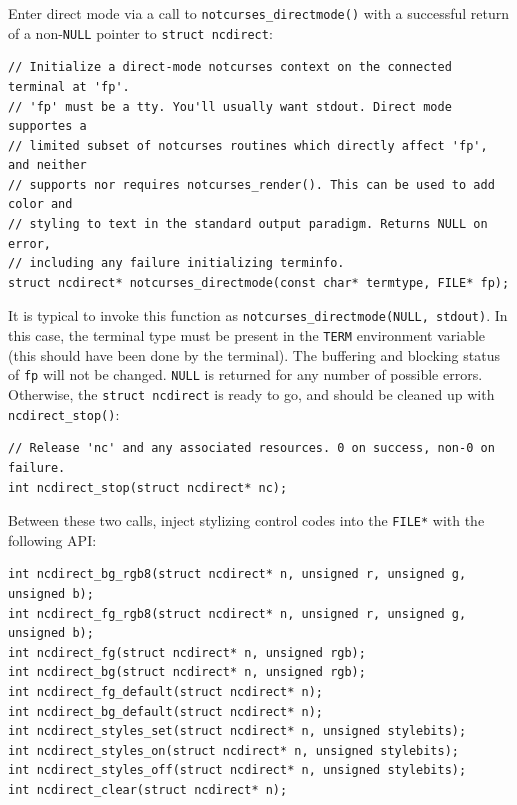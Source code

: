 \documentclass[letterpaper,10pt]{article}
\begin{document}
Enter direct mode via a call to \texttt{notcurses\_directmode()} with a successful
return of a non-\texttt{NULL} pointer to \texttt{struct ncdirect}:

\begin{listing}[ht]
\begin{verbatim}
// Initialize a direct-mode notcurses context on the connected terminal at 'fp'.
// 'fp' must be a tty. You'll usually want stdout. Direct mode supportes a
// limited subset of notcurses routines which directly affect 'fp', and neither
// supports nor requires notcurses_render(). This can be used to add color and
// styling to text in the standard output paradigm. Returns NULL on error,
// including any failure initializing terminfo.
struct ncdirect* notcurses_directmode(const char* termtype, FILE* fp);
\end{verbatim}
\end{listing}

It is typical to invoke this function as \texttt{notcurses\_directmode(NULL, stdout)}.
In this case, the terminal type must be present in the \texttt{TERM} environment
variable (this should have been done by the terminal). The buffering and
blocking status of \texttt{fp} will not be changed. \texttt{NULL} is returned for any number
of possible errors. Otherwise, the \texttt{struct ncdirect} is ready to go, and should
be cleaned up with \texttt{ncdirect\_stop()}:

\begin{listing}[ht]
\begin{verbatim}
// Release 'nc' and any associated resources. 0 on success, non-0 on failure.
int ncdirect_stop(struct ncdirect* nc);
\end{verbatim}
\end{listing}

Between these two calls, inject stylizing control codes into the \texttt{FILE*} with
the following API:

\begin{listing}[ht]
\begin{verbatim}
int ncdirect_bg_rgb8(struct ncdirect* n, unsigned r, unsigned g, unsigned b);
int ncdirect_fg_rgb8(struct ncdirect* n, unsigned r, unsigned g, unsigned b);
int ncdirect_fg(struct ncdirect* n, unsigned rgb);
int ncdirect_bg(struct ncdirect* n, unsigned rgb);
int ncdirect_fg_default(struct ncdirect* n);
int ncdirect_bg_default(struct ncdirect* n);
int ncdirect_styles_set(struct ncdirect* n, unsigned stylebits);
int ncdirect_styles_on(struct ncdirect* n, unsigned stylebits);
int ncdirect_styles_off(struct ncdirect* n, unsigned stylebits);
int ncdirect_clear(struct ncdirect* n);
\end{verbatim}
\end{listing}
\end{document}
